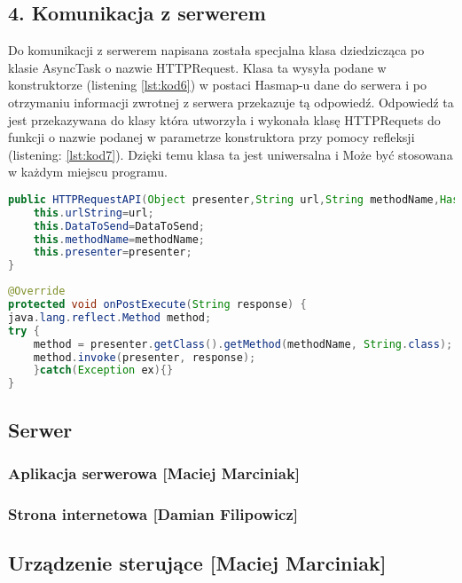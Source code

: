 		\subsection{4.	Komunikacja z serwerem}
		
		
		Do komunikacji z serwerem napisana została specjalna klasa dziedzicząca po klasie AsyncTask o nazwie HTTPRequest. Klasa ta wysyła podane w konstruktorze (listening \ref{lst:kod6}) w postaci Hasmap-u dane do serwera i po otrzymaniu informacji zwrotnej z serwera przekazuje tą odpowiedź. Odpowiedź ta jest przekazywana do klasy która utworzyła i wykonała klasę HTTPRequets do funkcji o nazwie podanej w parametrze konstruktora przy pomocy refleksji (listening: \ref{lst:kod7}). Dzięki temu klasa ta jest uniwersalna i Może być stosowana w każdym miejscu programu.
	
	\begin{lstlisting}[caption={Konstruktor klasy HTTPRequest.}, label={lst:kod6}, language=Java]
public HTTPRequestAPI(Object presenter,String url,String methodName,HashMap DataToSend) {
	this.urlString=url;
	this.DataToSend=DataToSend;
	this.methodName=methodName;
	this.presenter=presenter;
}

\end{lstlisting}	
	
		\begin{lstlisting}[caption={Metoda OnPost zwracająca odpowied"z serwera.}, label={lst:kod7}, language=Java]
@Override
protected void onPostExecute(String response) {
java.lang.reflect.Method method;
try {
	method = presenter.getClass().getMethod(methodName, String.class);
	method.invoke(presenter, response);
	}catch(Exception ex){}
}


	\end{lstlisting}	
		
\newpage
\subsection{Serwer}
	\subsubsection[Aplikacja serwerowa]{Aplikacja serwerowa [Maciej Marciniak]}
	\subsubsection[Strona internetowa]{Strona internetowa [Damian Filipowicz]}
\newpage
\subsection[Urządzenie sterujące]{Urządzenie sterujące [Maciej Marciniak]}

